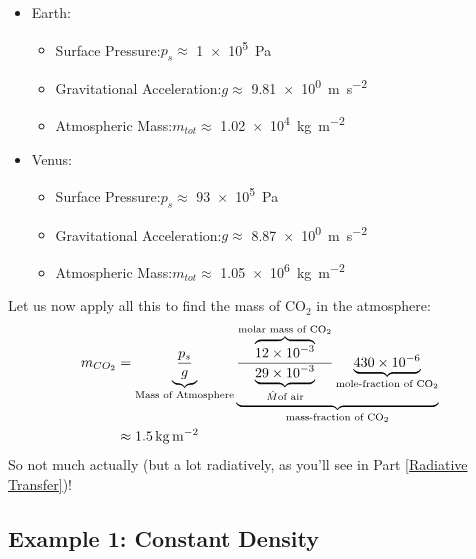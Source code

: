 \begin{multicols}{2}
\begin{itemize}
    \item Earth: 
    \begin{itemize}
        \item Surface Pressure:\newline $p_s\approx$ \qty{1e5}{\pascal}
        \item Gravitational Acceleration:\newline $g\approx$ \qty{9.81e0}{\metre\per\second\squared}
        \item Atmospheric Mass:\newline $m_{tot}\approx$ \qty{1.02e4}{\kilogram\per\metre\squared}
    \end{itemize}
    \item Venus: 
    \begin{itemize}
        \item Surface Pressure:\newline $p_s\approx$ \qty{93e5}{\pascal}
        \item Gravitational Acceleration:\newline $g\approx$ \qty{8.87e0}{\metre\per\second\squared}
        \item Atmospheric Mass:\newline $m_{tot}\approx$ \qty{1.05e6}{\kilogram\per\metre\squared}
    \end{itemize}
\end{itemize}
\end{multicols}
\noindent Let us now apply all this to find the mass of CO$_2$ in the atmosphere:
\begin{align*}
    m_{CO_2}&= \underbrace{\frac{p_s}{g}}_\text{Mass of Atmosphere} \underbrace{\frac{\overbrace{12\times10^{-3}}^{\text{molar mass of CO}_2}}{\underbrace{29\times10^{-3}}_{\hat{M} \text{of air}}} \underbrace{430 \times 10^{-6}}_{\text{mole-fraction of CO}_2}}_{\text{mass-fraction of CO}_2}\\
    &\approx\text{\qty{1.5}{\kilogram\per\meter\squared}}
\end{align*}
So not much actually (but a lot radiatively, as you'll see in Part \ref{Radiative Transfer})!
\subsection{Example 1: Constant Density}

